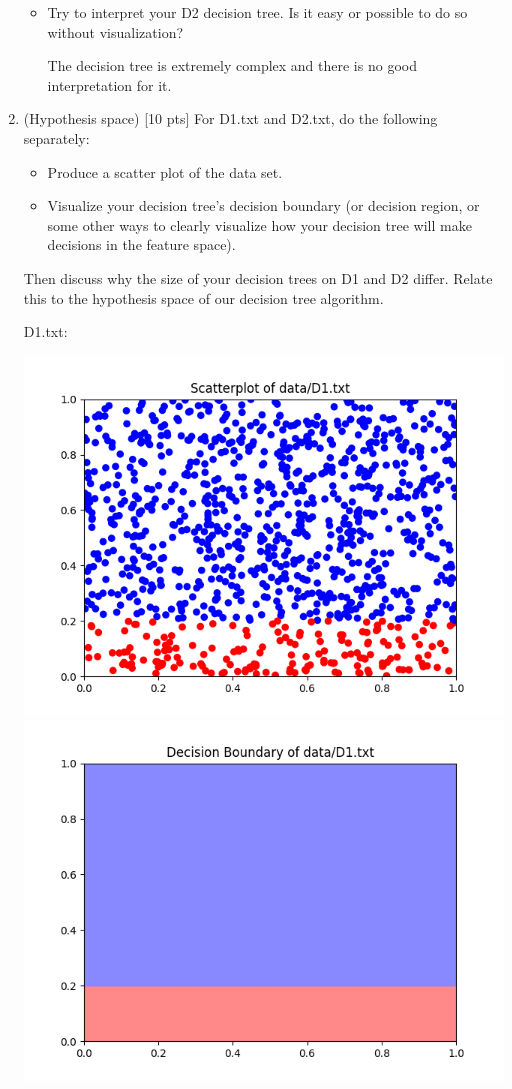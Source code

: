\documentclass[a4paper]{article}
\theoremstyle{definition}
\newenvironment{soln}{
    \leavevmode\color{blue}\ignorespaces
}{}
\begin{document}
\begin{enumerate}
\begin{itemize}
    \item Try to interpret your D2 decision tree. Is it easy or possible to do so without visualization? \\
          \begin{soln}
            The decision tree is extremely complex and there is no good interpretation for it.
          \end{soln}

  \end{itemize}

\item (Hypothesis space)  [10 pts] For D1.txt and D2.txt, do the following separately:
  \begin{itemize}

  \item Produce a scatter plot of the data set.

  \item Visualize your decision tree's decision boundary (or decision region, or some other ways to clearly visualize how your decision tree will make decisions in the feature space).

  \end{itemize}
        Then discuss why the size of your decision trees on D1 and D2 differ.  Relate this to the hypothesis space of our decision tree algorithm. \\

        \begin{soln}
          D1.txt:
          \begin{center}
            \includegraphics[width=0.6\linewidth]{D1plot.png}
            \includegraphics[width=0.6\linewidth]{D1region.png}
          \end{center}


\end{soln}
\end{enumerate}
\end{document}
